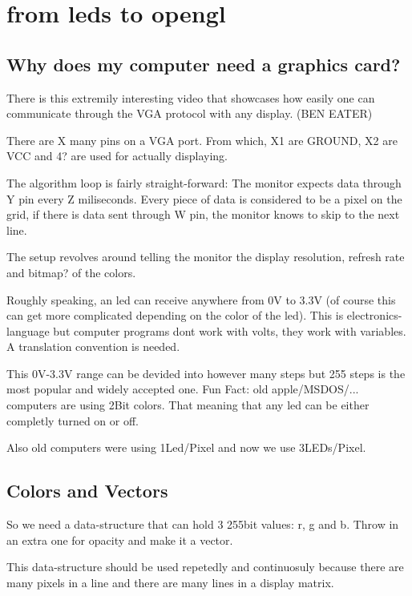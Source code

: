     \section{from leds to opengl}
        \subsection{Why does my computer need a graphics card?}
            There is this extremily interesting video that showcases how easily one can communicate through the VGA protocol with any display. (BEN EATER)

            There are X many pins on a VGA port. From which, X1 are GROUND, X2 are VCC and 4? are used for actually displaying.

            The algorithm loop is fairly straight-forward: The monitor expects data through Y pin every Z miliseconds. Every piece of data is considered to be a pixel on the grid, if there is data sent through W pin, the monitor knows to skip to the next line.

            The setup revolves around telling the monitor the display resolution, refresh rate and bitmap? of the colors. 

            Roughly speaking, an led can receive anywhere from 0V to 3.3V (of course this can get more complicated depending on the color of the led). This is electronics-language but computer programs dont work with volts, they work with variables. A translation convention is needed.

            This 0V-3.3V range can be devided into however many steps but 255 steps is the most popular and widely accepted one. 
            Fun Fact: old apple/MSDOS/... computers are using 2Bit colors. That meaning that any led can be either completly turned on or off.

            Also old computers were using 1Led/Pixel and now we use 3LEDs/Pixel.
        \subsection{Colors and Vectors}
            So we need a data-structure that can hold 3 255bit values: r, g and b. Throw in an extra one for opacity and make it a vector.


            This data-structure should be used repetedly and continuosuly because there are many pixels in a line and there are many lines in a display matrix.

